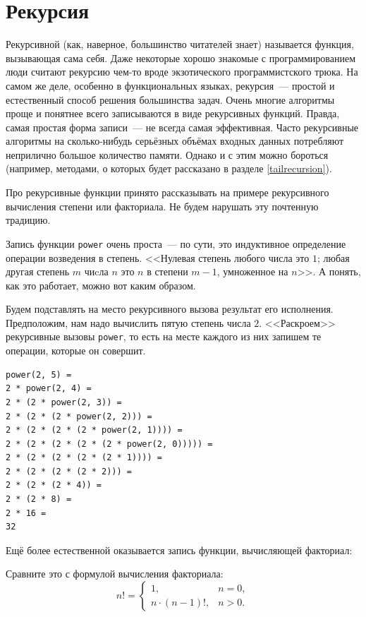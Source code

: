 \documentclass[
  paper=a4,
  fontsize=14pt,
  openany,
  appendixprefix=true
]{scrbook}
\begin{document}
\section{Рекурсия}
\label{recursion}

Рекурсивной (как, наверное, большинство читателей знает) называется функция, вызывающая сама себя. Даже некоторые хорошо знакомые с программированием люди считают рекурсию чем-то вроде экзотического программистского трюка. На самом же деле, особенно в функциональных языках, рекурсия~--- простой и естественный способ решения большинства задач. Очень многие алгоритмы проще и понятнее всего записываются в виде рекурсивных функций. Правда, самая простая форма записи~--- не всегда самая эффективная. Часто рекурсивные алгоритмы на сколько-нибудь серьёзных объёмах входных данных потребляют неприлично большое количество памяти. Однако и с этим можно бороться (например, методами, о которых будет рассказано в разделе \ref{tailrecursion}).

Про рекурсивные функции принято рассказывать на примере рекурсивного вычисления степени или факториала. Не будем нарушать эту почтенную традицию.



Запись функции \lstinline{power} очень проста~--- по сути, это индуктивное определение операции возведения в степень. <<Нулевая степень любого числа это $1$; любая другая степень $m$ чиcла $n$ это $n$ в степени $m-1$, умноженное на $n$>>. А понять, как это работает, можно вот каким образом.

Будем подставлять на место рекурсивного вызова результат его исполнения. Предположим, нам надо вычислить пятую степень числа $2$. <<Раскроем>> рекурсивные вызовы \lstinline{power}, то есть на месте каждого из них запишем те операции, которые он совершит.

\begin{verbatim}
power(2, 5) =
2 * power(2, 4) =
2 * (2 * power(2, 3)) = 
2 * (2 * (2 * power(2, 2))) =
2 * (2 * (2 * (2 * power(2, 1)))) =
2 * (2 * (2 * (2 * (2 * power(2, 0))))) =
2 * (2 * (2 * (2 * (2 * 1)))) =
2 * (2 * (2 * (2 * 2))) =
2 * (2 * (2 * 4)) =
2 * (2 * 8) =
2 * 16 =
32
\end{verbatim}

Ещё более естественной оказывается запись функции, вычисляющей факториал:


Сравните это с формулой вычисления факториала:
$$
n!= \begin{cases}
1,&n = 0,\\
n \cdot (n-1)!,&n > 0.
\end{cases}
$$
\end{document}
